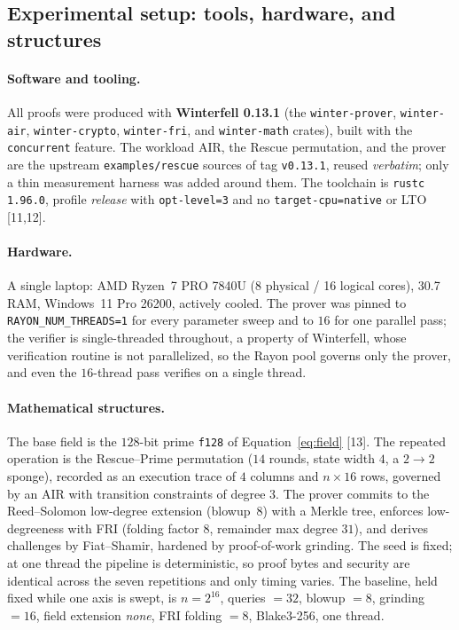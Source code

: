 \documentclass[11pt]{article}
\begin{document}
\subsection{Experimental setup: tools, hardware, and structures}
\label{sec:setup}

\paragraph{Software and tooling.} All proofs were produced with \textbf{Winterfell 0.13.1} (the
\texttt{winter-prover}, \texttt{winter-air}, \texttt{winter-crypto}, \texttt{winter-fri}, and
\texttt{winter-math} crates), built with the \texttt{concurrent} feature. The workload
AIR, the Rescue permutation, and the prover are the upstream \texttt{examples/rescue} sources of tag
\texttt{v0.13.1}, reused \emph{verbatim}; only a thin measurement harness was added around them.
The toolchain is \texttt{rustc 1.96.0}, profile \emph{release} with \texttt{opt-level=3} and
no \texttt{target-cpu=native} or LTO [11,12].

\paragraph{Hardware.} A single laptop: AMD Ryzen~7 PRO 7840U (8 physical / 16 logical cores),
\SI{30.7}{\giga\byte} RAM, Windows~11 Pro 26200, actively cooled. The prover was pinned to
\texttt{RAYON\_NUM\_THREADS=1} for every parameter sweep and to $16$ for one parallel pass; the verifier
is single-threaded throughout, a property of Winterfell, whose verification routine is not
parallelized, so the Rayon pool governs only the prover, and even the $16$-thread pass verifies on a
single thread.

\paragraph{Mathematical structures.} The base field is the $128$-bit prime \texttt{f128} of
Equation~\eqref{eq:field} [13]. The repeated operation is the Rescue--Prime permutation ($14$ rounds,
state width $4$, a $2\!\to\!2$ sponge), recorded as an execution trace of $4$ columns and $n\times 16$
rows, governed by an AIR with transition constraints of degree $3$. The prover commits to the
Reed--Solomon low-degree extension (blowup~$8$) with a Merkle tree, enforces low-degreeness with FRI
(folding factor $8$, remainder max degree $31$), and derives challenges by Fiat--Shamir, hardened by
proof-of-work grinding. The seed is fixed; at one thread the pipeline is deterministic, so proof bytes
and security are identical across the seven repetitions and only timing varies. The baseline, held
fixed while one axis is swept, is $n=2^{16}$, queries $=32$, blowup $=8$, grinding $=16$, field
extension \emph{none}, FRI folding $=8$, Blake3-256, one thread.
\end{document}
